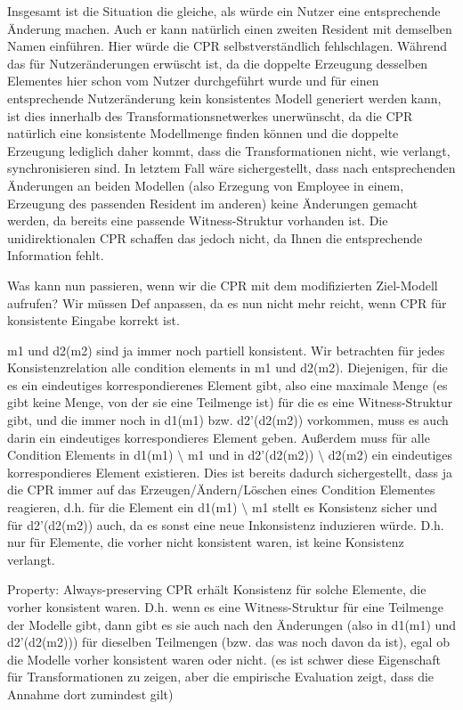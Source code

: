 Insgesamt ist die Situation die gleiche, als würde ein Nutzer eine entsprechende Änderung machen. Auch er kann natürlich einen zweiten Resident mit demselben Namen einführen. Hier würde die CPR selbstverständlich fehlschlagen. Während das für Nutzeränderungen erwüscht ist, da die doppelte Erzeugung desselben Elementes hier schon vom Nutzer durchgeführt wurde und für einen entsprechende Nutzeränderung kein konsistentes Modell generiert werden kann, ist dies innerhalb des Transformationsnetwerkes unerwünscht, da die CPR natürlich eine konsistente Modellmenge finden können und die doppelte Erzeugung lediglich daher kommt, dass die Transformationen nicht, wie verlangt, synchronisieren sind. In letztem Fall wäre sichergestellt, dass nach entsprechenden Änderungen an beiden Modellen (also Erzegung von Employee in einem, Erzeugung des passenden Resident im anderen) keine Änderungen gemacht werden, da bereits eine passende Witness-Struktur vorhanden ist.
Die unidirektionalen CPR schaffen das jedoch nicht, da Ihnen die entsprechende Information fehlt.

Was kann nun passieren, wenn wir die CPR mit dem modifizierten Ziel-Modell aufrufen?
Wir müssen Def anpassen, da es nun nicht mehr reicht, wenn CPR für konsistente Eingabe korrekt ist.

m1 und d2(m2) sind ja immer noch partiell konsistent. Wir betrachten für jedes Konsistenzrelation alle condition elements in m1 und d2(m2).
Diejenigen, für die es ein eindeutiges korrespondierenes Element gibt, also eine maximale Menge (es gibt keine Menge, von der sie eine Teilmenge ist) für die es eine Witness-Struktur gibt, und die immer noch in d1(m1) bzw. d2'(d2(m2)) vorkommen, muss es auch darin ein eindeutiges korrespondieres Element geben.
Außerdem muss für alle Condition Elements in d1(m1) $\setminus$ m1 und in d2'(d2(m2)) $\setminus$ d2(m2) ein eindeutiges korrespondieres Element existieren.
Dies ist bereits dadurch sichergestellt, dass ja die CPR immer auf das Erzeugen/Ändern/Löschen eines Condition Elementes reagieren, d.h. für die Element ein d1(m1) $\setminus$ m1 stellt es Konsistenz sicher und für d2'(d2(m2)) auch, da es sonst eine neue Inkonsistenz induzieren würde.
D.h. nur für Elemente, die vorher nicht konsistent waren, ist keine Konsistenz verlangt.

Property: Always-preserving
CPR erhält Konsistenz für solche Elemente, die vorher konsistent waren. D.h. wenn es eine Witness-Struktur für eine Teilmenge der Modelle gibt, dann gibt es sie auch nach den Änderungen (also in d1(m1) und d2'(d2(m2))) für dieselben Teilmengen (bzw. das was noch davon da ist), egal ob die Modelle vorher konsistent waren oder nicht. (es ist schwer diese Eigenschaft für Transformationen zu zeigen, aber die empirische Evaluation zeigt, dass die Annahme dort zumindest gilt)

